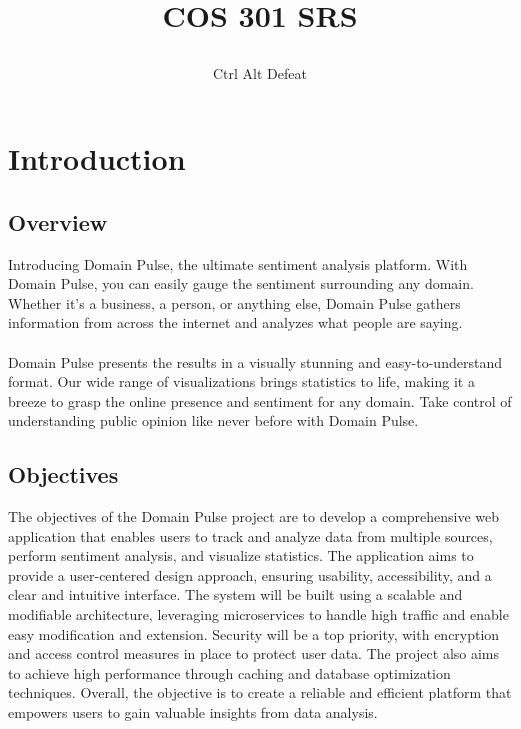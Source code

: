 \documentclass[12pt]{article}
\title{

\\
{COS 301 SRS}
}
\author{Ctrl Alt Defeat}
\begin{document}



\tableofcontents

\newpage











\section{Introduction}

\subsection{Overview}
Introducing Domain Pulse, the ultimate sentiment analysis platform. With Domain Pulse, you can easily gauge the sentiment surrounding any domain. Whether it's a business, a person, or anything else, Domain Pulse gathers information from across the internet and analyzes what people are saying.\\
\\Domain Pulse presents the results in a visually stunning and easy-to-understand format. Our wide range of visualizations brings statistics to life, making it a breeze to grasp the online presence and sentiment for any domain. Take control of understanding public opinion like never before with Domain Pulse.
\subsection{Objectives}

The objectives of the Domain Pulse project are to develop a comprehensive web application that enables users to track and analyze data from multiple sources, perform sentiment analysis, and visualize statistics. The application aims to provide a user-centered design approach, ensuring usability, accessibility, and a clear and intuitive interface. The system will be built using a scalable and modifiable architecture, leveraging microservices to handle high traffic and enable easy modification and extension. Security will be a top priority, with encryption and access control measures in place to protect user data. The project also aims to achieve high performance through caching and database optimization techniques. Overall, the objective is to create a reliable and efficient platform that empowers users to gain valuable insights from data analysis.

\newpage
\end{document}
